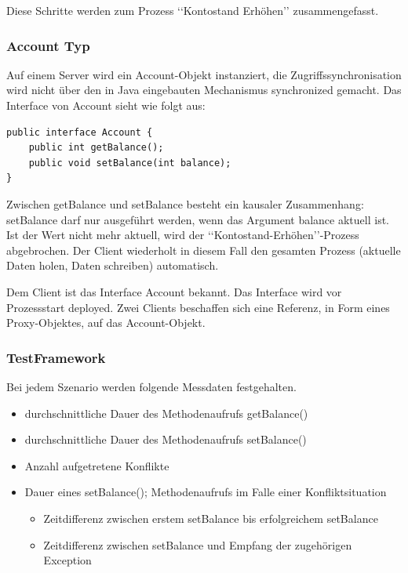 \documentclass{article}
\begin{document}
\noindent Diese Schritte werden zum Prozess ‘‘Kontostand Erhöhen’’ zusammengefasst.

\subsubsection{Account Typ}
\label{sec:account-typ}

Auf einem Server wird ein Account-Objekt instanziert, die Zugriffssynchronisation wird nicht über den in Java eingebauten Mechanismus synchronized gemacht. Das Interface von Account sieht wie folgt aus:
\begin{lstlisting}
public interface Account {
    public int getBalance();
    public void setBalance(int balance);    
}
\end{lstlisting}
Zwischen getBalance und setBalance besteht ein kausaler Zusammenhang: setBalance darf nur ausgeführt werden, wenn das Argument balance aktuell ist. Ist der Wert nicht mehr aktuell, wird der ‘‘Kontostand-Erhöhen’’-Prozess abgebrochen. Der Client wiederholt in diesem Fall den gesamten Prozess (aktuelle Daten holen, Daten schreiben) automatisch.

Dem Client ist das Interface Account bekannt. Das Interface wird vor Prozessstart deployed.
Zwei Clients beschaffen sich eine Referenz, in Form eines Proxy-Objektes, auf das Account-Objekt. 

\subsubsection{TestFramework}
\label{sec:testframework-1}


Bei jedem Szenario werden folgende Messdaten festgehalten.
\begin{itemize}
\item durchschnittliche Dauer des Methodenaufrufs getBalance()
\item durchschnittliche Dauer des Methodenaufrufs setBalance()
\item Anzahl aufgetretene Konflikte
\item Dauer eines setBalance(); Methodenaufrufs im Falle einer Konfliktsituation
  \begin{itemize}
  \item Zeitdifferenz zwischen erstem setBalance bis erfolgreichem setBalance
  \item Zeitdifferenz zwischen setBalance und Empfang der zugehörigen Exception
  \end{itemize}
\end{itemize}
\end{document}
